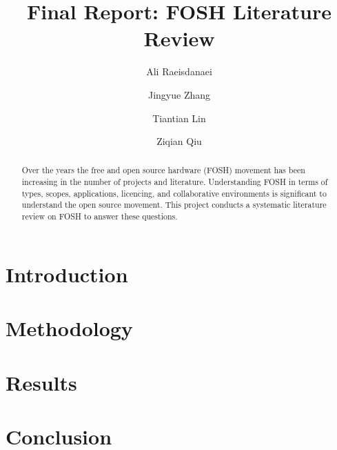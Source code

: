 \documentclass[acmtog]{acmart}
\begin{document}
\title{Final Report: FOSH Literature Review}

\author{Ali Raeisdanaei}

\author{Jingyue Zhang}

\author{Tiantian Lin}

\author{Ziqian Qiu}

\begin{abstract}
Over the years the free and open source hardware (FOSH) movement has been increasing in the number of projects and literature. 
Understanding FOSH in terms of types, scopes, applications, licencing, and collaborative environments is significant to understand the open source movement.
This project conducts a systematic literature review on FOSH to answer these questions.
\end{abstract}


\maketitle

\section{Introduction}
\label{introduction}


\section{Methodology}
\label{methodology}


\section{Results}
\label{results}



\section{Conclusion}
\label{conclusion}

\end{document}
